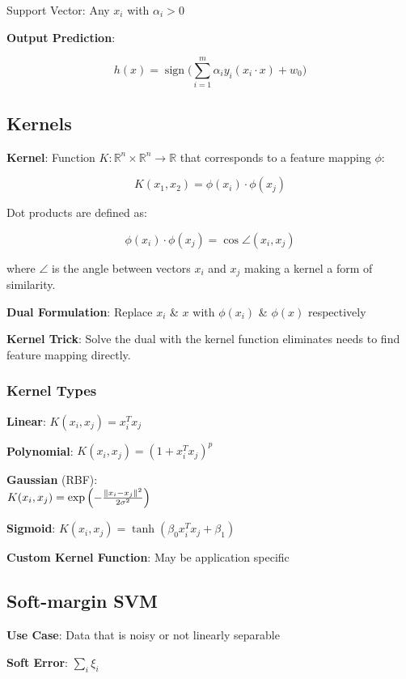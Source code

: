 \documentclass[10pt]{article}
\newcommand{\colortext}[2]{{\color{#1} #2}}
\newcommand{\red}[1]{\colortext{red}{#1}}
\newcommand{\blue}[1]{\colortext{blue}{#1}}
\DeclareMathOperator*{\sign}{sign}
\DeclarePairedDelimiter{\norm}{\lVert}{\rVert}
\begin{document}
\begin{multicols}{3}
  \blue{Support Vector}: Any $x_i$ with $\alpha_i>0$

  \textbf{Output Prediction}:

  \[h(x) = \sign\bigg(\sum_{i=1}^{m}\alpha_{i}y_{i}(x_i\cdot x) + w_0\bigg) \]

  \subsection*{Kernels}
  \textbf{Kernel}: Function $K:\mathbb{R}^{n}\times\mathbb{R}^{n} \rightarrow \mathbb{R}$ that corresponds to a \blue{feature mapping} $\phi$:

  \[K(x_1,x_2)=\phi(x_i)\cdot\phi(x_j) \]

  Dot products are defined as:

  \[\phi(x_i) \cdot \phi(x_j) = \cos\angle(x_i,x_j) \]

  where $\angle$ is the angle between vectors $x_i$ and $x_j$ making a kernel a form of \red{similarity}.

  \textbf{\blue{Dual Formulation}}: Replace $x_i$ \& $x$ with $\phi(x_i)$ \& $\phi(x)$ respectively

  \textbf{\blue{Kernel Trick}}: Solve the dual with the kernel function eliminates needs to find feature mapping directly.

  \subsubsection*{Kernel Types}

  \textbf{Linear}: $K(x_i,x_j)=x_{i}^{T}x_j$

  \textbf{Polynomial}: $K(x_i,x_j)=(1+ x_{i}^{T}x_j)^p$

  \textbf{Gaussian} (RBF): \\
  $K(x_i,x_j)=\exp\left(-\frac{\norm{x_{i} - x_{j}}^2}{2\sigma^2}\right)$

  \textbf{Sigmoid}: $K(x_i,x_j) = \tanh(\beta_{0} x_{i}^{T}x_{j} +\beta_1)$

  \textbf{Custom Kernel Function}: May be application specific

  \subsection{Soft-margin SVM}

  \textbf{Use Case}: Data that is \red{noisy} or \red{not linearly separable}

  \textbf{\blue{Soft Error}}: $\sum_{i}\xi_i$


\end{multicols}
\end{document}
